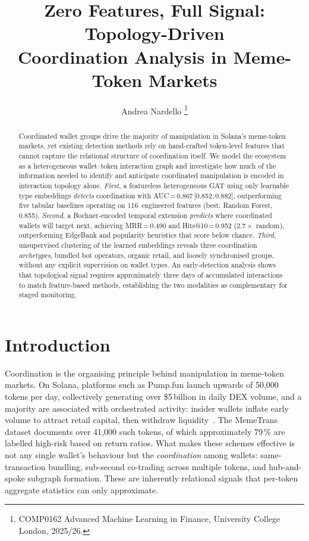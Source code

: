 \documentclass[10pt,journal]{IEEEtran}
\title{Zero Features, Full Signal: Topology-Driven\\
Coordination Analysis in Meme-Token Markets}
\author{Andrea Nardello
\thanks{COMP0162 Advanced Machine Learning in Finance, University
College London, 2025/26.}}
\begin{document}
\maketitle

\begin{abstract}
Coordinated wallet groups drive the majority of manipulation in
Solana's meme-token markets, yet existing detection methods rely on
hand-crafted token-level features that cannot capture the relational
structure of coordination itself. We model the ecosystem as a
heterogeneous wallet--token interaction graph and investigate how much
of the information needed to identify and anticipate coordinated
manipulation is encoded in interaction topology alone.
\textit{First}, a featureless heterogeneous GAT using only learnable type
embeddings \emph{detects} coordination with
AUC\,=\,0.867\,[0.852,\,0.882], outperforming five tabular
baselines operating on 116~engineered features (best: Random Forest,
0.855). \textit{Second}, a Bochner-encoded temporal extension
\emph{predicts} where coordinated wallets will target next, achieving
MRR\,=\,0.490 and Hits@10\,=\,0.952 ($2.7\times$ random), outperforming
EdgeBank and popularity heuristics that score below chance.
\textit{Third}, unsupervised clustering of the learned embeddings
reveals three coordination \emph{archetypes}, bundled bot operators,
organic retail, and loosely synchronised groups, without any explicit
supervision on wallet types. An early-detection analysis shows that
topological signal requires approximately three days of accumulated
interactions to match feature-based methods, establishing the two
modalities as complementary for staged monitoring.
\end{abstract}

\section{Introduction}
\label{sec:intro}

Coordination is the organising principle behind manipulation in
meme-token markets. On Solana, platforms such as Pump.fun launch
upwards of 50{,}000 tokens per day, collectively generating over
\$5\,billion in daily DEX volume, and a majority are associated
with orchestrated activity: insider wallets inflate early volume to
attract retail capital, then withdraw
liquidity~\cite{hu2026memetrans}. The MemeTrans dataset documents
over 41{,}000 such tokens, of which approximately 79\,\% are labelled
high-risk based on return ratios. What makes these schemes effective
is not any single wallet's behaviour but the \emph{coordination}
among wallets: same-transaction bundling, sub-second co-trading
across multiple tokens, and hub-and-spoke subgraph formation. These
are inherently relational signals that per-token aggregate statistics
can only approximate.
\end{document}
